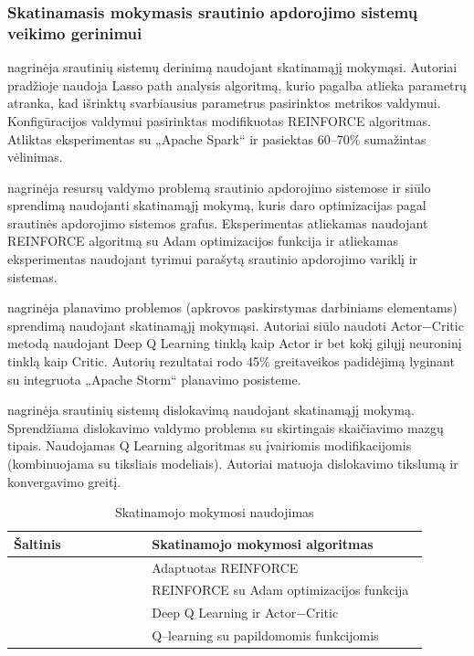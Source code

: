 \documentclass{VUMIFPSbakalaurinis}
\begin{document}
\subsubsection{Skatinamasis mokymasis srautinio apdorojimo sistemų veikimo gerinimui}

\cite{vaquero2018autotuning} nagrinėja srautinių sistemų derinimą naudojant skatinamąjį mokymąsi. Autoriai pradžioje naudoja Lasso path analysis algoritmą, kurio pagalba atlieka parametrų atranka, kad išrinktų svarbiausius parametrus pasirinktos metrikos valdymui. Konfigūracijos valdymui pasirinktas modifikuotas REINFORCE algoritmas. Atliktas eksperimentas su „Apache Spark“ ir pasiektas 60–70\% sumažintas vėlinimas.

\cite{ni2019generalizable} nagrinėja resursų valdymo problemą srautinio apdorojimo sistemose ir siūlo sprendimą naudojanti skatinamąjį mokymą, kuris daro optimizacijas pagal srautinės apdorojimo sistemos grafus. Eksperimentas atliekamas naudojant REINFORCE \cite{williams1992simple} algoritmą su Adam optimizacijos funkcija \cite{kingma2014adam} ir atliekamas eksperimentas naudojant tyrimui parašytą srautinio apdorojimo variklį ir sistemas. 

\cite{Li2018Model} nagrinėja planavimo problemos (apkrovos paskirstymas darbiniams elementams) sprendimą naudojant skatinamąjį mokymąsi. Autoriai siūlo naudoti Actor−Critic \cite{lillicrap2015continuous} metodą naudojant Deep Q Learning \cite{mnih2015human} tinklą kaip Actor ir bet kokį gilųjį neuroninį tinklą kaip Critic. Autorių rezultatai rodo 45\% greitaveikos padidėjimą lyginant su integruota „Apache Storm“ planavimo posisteme. 

\cite{Russo2019Reinforcement} nagrinėja srautinių sistemų dislokavimą naudojant skatinamąjį mokymą. Sprendžiama dislokavimo valdymo problema su skirtingais skaičiavimo mazgų tipais. Naudojamas Q Learning algoritmas su įvairiomis modifikacijomis (kombinuojama su tiksliais modeliais). Autoriai matuoja dislokavimo tikslumą ir konvergavimo greitį. 

\begin{longtable}{|p{0.3\linewidth}|p{0.6\linewidth}|}
    \caption{Skatinamojo mokymosi naudojimas}
    \label{ml–usage}\\
    \hline
    \rowcolor[HTML]{C0C0C0} 
    Šaltinis                         & Skatinamojo mokymosi algoritmas    \\ \hline
    \cite{vaquero2018autotuning}     & Adaptuotas REINFORCE \cite{williams1992simple}        \\ \hline
    \cite{ni2019generalizable}       & REINFORCE \cite{williams1992simple}  su Adam optimizacijos funkcija \cite{kingma2014adam}     \\ \hline
    \cite{Li2018Model}               & Deep Q Learning \cite{mnih2015human} ir Actor−Critic \cite{lillicrap2015continuous} \\ \hline
    \cite{Russo2019Reinforcement}    & Q–learning \cite{mnih2015human} su papildomomis funkcijomis \\ \hline
\end{longtable}
\end{document}

